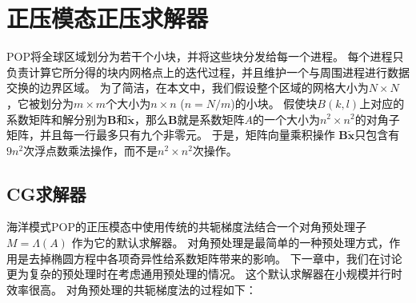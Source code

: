 \section{正压模态正压求解器}
\label{solver:bottleneck}

POP将全球区域划分为若干个小块，并将这些块分发给每一个进程。
每个进程只负责计算它所分得的块内网格点上的迭代过程，并且维护一个与周围进程进行数据交换的边界区域。 
为了简洁，在本文中，我们假设整个区域的网格大小为$N\times N$，它被划分为$m\times m$个大小为$n\times n$ ($n=N/m$)的小块。 
假使块$B(k,l)$上对应的系数矩阵和解分别为$\textbf{B}$和$\tilde{\textbf{x}}$，那么$\textbf{B}$就是系数矩阵$A$的一个大小为$n^2\times n^2$的对角子矩阵，并且每一行最多只有九个非零元\cite{hu2013scalable}。 
于是，矩阵向量乘积操作 $\textbf{B}\tilde{\textbf{x}}$只包含有$9n^2$次浮点数乘法操作，而不是$n^2\times n^2$次操作。 
 
\subsection{CG求解器} 
\label{solver:pcg}
 
海洋模式POP的正压模态中使用传统的共轭梯度法结合一个对角预处理子$M = \Lambda(A)$ 作为它的默认求解器。 
对角预处理是最简单的一种预处理方式，作用是去掉椭圆方程中各项奇异性给系数矩阵带来的影响。
下一章中，我们在讨论更为复杂的预处理时在考虑通用预处理的情况。
这个默认求解器在小规模并行时效率很高。 
对角预处理的共轭梯度法的过程如下： 

